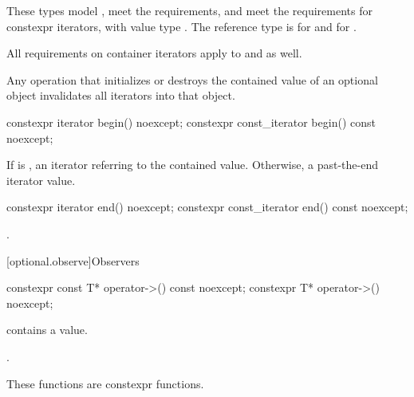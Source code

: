 \begin{itemdescr}
\pnum
These types
model ,
meet the  requirements, and
meet the requirements for constexpr iterators,
with value type .
The reference type is  for  and
 for .

\pnum
All requirements on container iterators apply to
 and  as well.

\pnum
Any operation that initializes or destroys the contained value of an optional object invalidates all iterators into that object.
\end{itemdescr}

%
\begin{itemdecl}
constexpr iterator begin() noexcept;
constexpr const_iterator begin() const noexcept;
\end{itemdecl}

\begin{itemdescr}
\pnum
\returns
If  is ,
an iterator referring to the contained value.
Otherwise, a past-the-end iterator value.
\end{itemdescr}

%
\begin{itemdecl}
constexpr iterator end() noexcept;
constexpr const_iterator end() const noexcept;
\end{itemdecl}

\begin{itemdescr}
\pnum
\returns
{}.
\end{itemdescr}

[optional.observe]{Observers}

%
\begin{itemdecl}
constexpr const T* operator->() const noexcept;
constexpr T* operator->() noexcept;
\end{itemdecl}

\begin{itemdescr}
\pnum
\expects
{} contains a value.

\pnum
\returns
{}.

\pnum
\remarks
These functions are constexpr functions.
\end{itemdescr}

